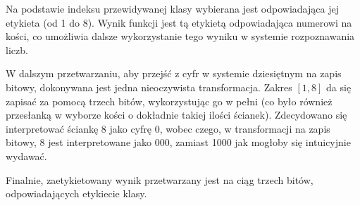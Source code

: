 Na podstawie indeksu przewidywanej klasy wybierana jest odpowiadająca jej etykieta (od 1 do 8).
Wynik funkcji jest tą etykietą odpowiadająca numerowi na kości,
co umożliwia dalsze wykorzystanie tego wyniku w systemie rozpoznawania liczb.

W dalszym przetwarzaniu, aby przejść z cyfr w systemie dziesiętnym na zapis bitowy, dokonywana jest jedna nieoczywista transformacja.
Zakres $[1, 8]$ da się zapisać za pomocą trzech bitów, wykorzystując go w pełni (co było również przesłanką w wyborze kości o dokładnie takiej ilości ścianek).
Zdecydowano się interpretować ściankę 8 jako cyfrę 0, wobec czego, w transformacji na zapis bitowy,
8 jest interpretowane jako 000, zamiast 1000 jak mogłoby się intuicyjnie wydawać.

Finalnie, zaetykietowany wynik przetwarzany jest na ciąg trzech bitów, odpowiadających etykiecie klasy.
